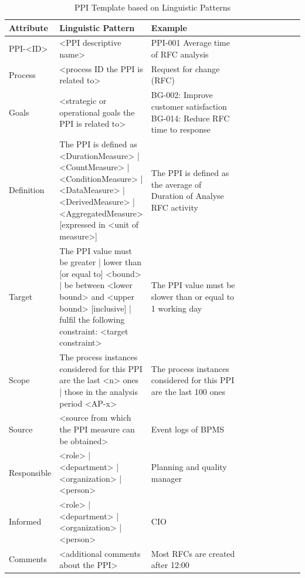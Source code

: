 \begin{table}[htbp]
	\footnotesize
	\centering
	\begin{tabular}[t]{@{}l p{0.3\linewidth} p{0.4\linewidth} p{0.5\linewidth} @{}}
		\toprule
		\textbf{Attribute} & \textbf{Linguistic Pattern}  & \textbf{Example}\\
		\midrule
		PPI-<ID> & <PPI descriptive name> & PPI-001 Average time of RFC analysis
		\\
		Process	& <process ID the PPI is related to> & Request for change (RFC)
		\\
		Goals & <strategic or operational goals the PPI is related to> & BG-002: Improve customer satisfaction \newline
		BG-014: Reduce RFC time to response
		\\
		Definition & The PPI is defined as { \newline
			<DurationMeasure> | <CountMeasure> | <ConditionMeasure> |
			<DataMeasure> | <DerivedMeasure> | <AggregatedMeasure> }
		[expressed in <unit of measure>] & The PPI is defined as the average of Duration of Analyse RFC activity
		\\
		Target & The PPI value must { \newline
			be {greater | lower} than [or equal to] <bound> | \newline
			be between <lower bound> and <upper bound> [inclusive] |\newline
			fulfil the following constraint: <target constraint> } & The PPI value must be slower than or equal to 1 working day
		\\
		Scope & The process instances considered for this PPI are {
			the last <n> ones |
			those in the analysis period <AP-x> } & The process instances considered for this PPI are the last 100 ones
		\\
		Source & <source from which the PPI measure can be obtained> &	Event logs of BPMS
		\\
		Responsible & { <role> | <department> | <organization> | <person> } &	Planning and quality manager
		\\
		Informed &{ <role> | <department> | <organization> | <person> } & CIO
		\\
		Comments & <additional comments about the PPI> & Most RFCs are created after 12:00
		\\
\bottomrule
\end{tabular}
\caption{PPI Template based on Linguistic Patterns \cite{article:ProcessPerfInd}}
\label{tbl:Fact-Sheet-PPI}
\end{table}
